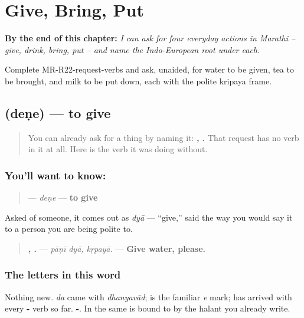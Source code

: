 
\chapter{Give, Bring, Put}
\label{ch:mr-request-verbs}

\begin{chapteropening}
\textbf{By the end of this chapter:} \emph{I can ask for four everyday actions in Marathi -- give, drink, bring, put -- and name the Indo-European root under each.}

Complete MR-R22-request-verbs and ask, unaided, for water to be given, tea to be brought, and milk to be put down, each with the polite kripaya frame.
\end{chapteropening}

\section[deṇe]{ (deṇe) — to give}

\label{lesson:MR-C22-dene}



\begin{quote}
You can already ask for a thing by naming it: \textbf{, .} That request has no verb in it at all. Here is the verb it was doing without.
\end{quote}

\subsection*{You'll want to know: }
\begin{quote}
\textbf{} — \emph{deṇe} — \textbf{to give}
\end{quote}

Asked of someone, it comes out as \textbf{} \emph{dyā} — \textquotedblleft{}give,\textquotedblright{} said the way you would say it to a person you are being polite to.

\begin{quote}
\textbf{ , .} — \emph{pāṇī dyā, kṛpayā.} — \textbf{Give water, please.}
\end{quote}

\subsection*{The letters in this word}
Nothing new. \textbf{} \emph{da} came with \emph{dhanyavād}; \textbf{} is the familiar \emph{e} mark; \textbf{} has arrived with every \textbf{-} verb so far. \textbf{-}. In \textbf{} the same \textbf{} is bound to \textbf{} by the halant you already write.

